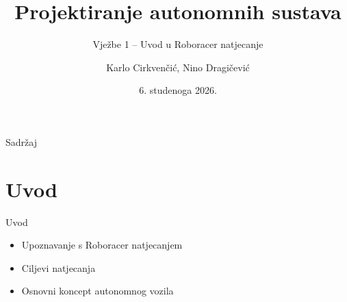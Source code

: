 \documentclass[aspectratio=169,11pt]{beamer}
\title{Projektiranje autonomnih sustava}
\subtitle{Vježbe 1 -- Uvod u Roboracer natjecanje}
\author{Karlo Cirkvenčić, Nino Dragičević}
\institute{Fakultet strojarstva i brodogradnje}
\date{6. studenoga 2026.}
\begin{document}
\begin{frame}
    \titlepage
\end{frame}

\begin{frame}{Sadržaj}
    \tableofcontents
\end{frame}

\section{Uvod}

\begin{frame}{Uvod}
    \begin{itemize}
        \item Upoznavanje s Roboracer natjecanjem
        \item Ciljevi natjecanja
        \item Osnovni koncept autonomnog vozila
    \end{itemize}
\end{frame}
\end{document}
